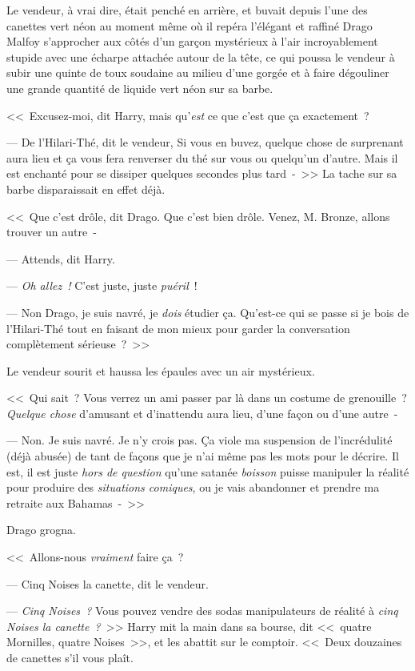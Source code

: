Le vendeur, à vrai dire, était penché en arrière, et buvait depuis l'une des canettes vert néon au moment même où il repéra l'élégant et raffiné Drago Malfoy s'approcher aux côtés d'un garçon mystérieux à l'air incroyablement stupide avec une écharpe attachée autour de la tête, ce qui poussa le vendeur à subir une quinte de toux soudaine au milieu d'une gorgée et à faire dégouliner une grande quantité de liquide vert néon sur sa barbe.

<<~Excusez-moi, dit Harry, mais qu'\emph{est} ce que c'est que ça exactement~?

--- De l'Hilari-Thé, dit le vendeur, Si vous en buvez, quelque chose de surprenant aura lieu et ça vous fera renverser du thé sur vous ou quelqu'un d'autre. Mais il est enchanté pour se dissiper quelques secondes plus tard~-~>> La tache sur sa barbe disparaissait en effet déjà.

<<~Que c'est drôle, dit Drago. Que c'est bien drôle. Venez, M. Bronze, allons trouver un autre~-

--- Attends, dit Harry.

--- \emph{Oh allez~!} C'est juste, juste \emph{puéril}~!

--- Non Drago, je suis navré, je \emph{dois} étudier ça. Qu'est-ce qui se passe si je bois de l'Hilari-Thé tout en faisant de mon mieux pour garder la conversation complètement sérieuse~?~>>

Le vendeur sourit et haussa les épaules avec un air mystérieux.

<<~Qui sait~? Vous verrez un ami passer par là dans un costume de grenouille~? \emph{Quelque chose} d'amusant et d'inattendu aura lieu, d'une façon ou d'une autre~-

--- Non. Je suis navré. Je n'y crois pas. Ça viole ma suspension de l'incrédulité (déjà abusée) de tant de façons que je n'ai même pas les mots pour le décrire. Il est, il est juste \emph{hors de question} qu'une satanée \emph{boisson} puisse manipuler la réalité pour produire des \emph{situations comiques}, ou je vais abandonner et prendre ma retraite aux Bahamas~-~>>

Drago grogna.

<<~Allons-nous \emph{vraiment} faire ça~?

--- Cinq Noises la canette, dit le vendeur.

--- \emph{Cinq Noises~?} Vous pouvez vendre des sodas manipulateurs de réalité à \emph{cinq Noises la canette~?}~>> Harry mit la main dans sa bourse, dit <<~quatre Mornilles, quatre Noises~>>, et les abattit sur le comptoir. <<~Deux douzaines de canettes s'il vous plaît.


